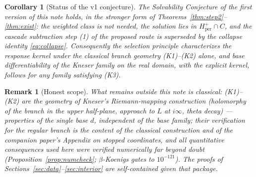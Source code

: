 \documentclass[11pt]{article}
\newtheorem{remark}[theorem]{Remark}
\newtheorem{corollary}[theorem]{Corollary}
\begin{document}
\begin{corollary}[Status of the v1 conjecture]\label{cor:conj}
The Solvability Conjecture of the first version of this note holds, in
the stronger form of Theorems~\ref{thm:step2}--\ref{thm:exist}: the
weighted class is not needed, the solution lies in
$H^{+}_{\mathrm{per}}\cap C$, and the cascade subtraction step (1) of the
proposed route is superseded by the collapse identity
\eqref{eq:collapse}.  Consequently the selection principle characterizes
the response kernel under the classical branch geometry (K1)--(K2) alone,
and base differentiability of the Kneser family on the real domain, with
the explicit kernel, follows for any family satisfying (K3).
\end{corollary}

\begin{remark}[Honest scope]\label{rem:scope}
What remains outside this note is classical: (K1)--(K2) are the geometry
of Kneser's Riemann-mapping construction \cite{kneser} (holomorphy of the
branch in the upper half-plane, approach to $L$ at $i\infty$, theta decay)
--- properties of the single base $d$, independent of the base family;
their verification for the regular branch is the content of the classical
construction and of the companion paper's Appendix on stopped
coordinates, and all quantitative consequences used here were verified
numerically far beyond doubt (Proposition~\ref{prop:numcheck};
$\beta$-Koenigs gates to $10^{-121}$).  The proofs of
Sections~\ref{sec:data}--\ref{sec:interior} are self-contained given that
package.
\end{remark}
\end{document}
